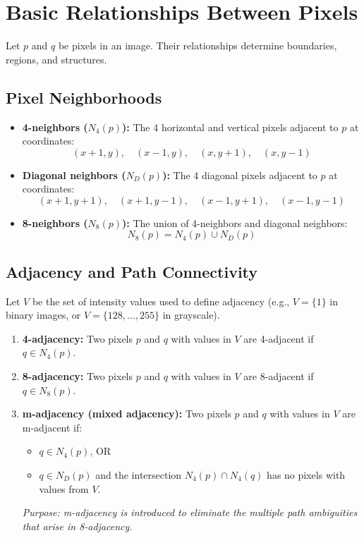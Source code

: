 \documentclass[12pt,a4paper]{article}
\begin{document}
\section{Basic Relationships Between Pixels}

Let $p$ and $q$ be pixels in an image. Their relationships determine boundaries, regions, and structures.

\subsection{Pixel Neighborhoods}
\begin{itemize}[leftmargin=*, itemsep=3.5pt]
  \item \textbf{4-neighbors ($N_4(p)$):} The 4 horizontal and vertical pixels adjacent to $p$ at coordinates:
    \begin{equation}
      (x+1, y), \quad (x-1, y), \quad (x, y+1), \quad (x, y-1)
    \end{equation}
  \item \textbf{Diagonal neighbors ($N_D(p)$):} The 4 diagonal pixels adjacent to $p$ at coordinates:
    \begin{equation}
      (x+1, y+1), \quad (x+1, y-1), \quad (x-1, y+1), \quad (x-1, y-1)
    \end{equation}
  \item \textbf{8-neighbors ($N_8(p)$):} The union of 4-neighbors and diagonal neighbors:
    \begin{equation}
      N_8(p) = N_4(p) \cup N_D(p)
    \end{equation}
\end{itemize}

\subsection{Adjacency and Path Connectivity}
Let $V$ be the set of intensity values used to define adjacency (e.g., $V = \{1\}$ in binary images, or $V = \{128, \dots, 255\}$ in grayscale).
\begin{enumerate}[leftmargin=*, itemsep=3.5pt]
  \item \textbf{4-adjacency:} Two pixels $p$ and $q$ with values in $V$ are 4-adjacent if $q \in N_4(p)$.
  \item \textbf{8-adjacency:} Two pixels $p$ and $q$ with values in $V$ are 8-adjacent if $q \in N_8(p)$.
  \item \textbf{m-adjacency (mixed adjacency):} Two pixels $p$ and $q$ with values in $V$ are m-adjacent if:
    \begin{itemize}[leftmargin=1.5em, itemsep=1pt]
      \item $q \in N_4(p)$, OR
      \item $q \in N_D(p)$ and the intersection $N_4(p) \cap N_4(q)$ has no pixels with values from $V$.
    \end{itemize}
    \textit{Purpose: m-adjacency is introduced to eliminate the multiple path ambiguities that arise in 8-adjacency.}
\end{enumerate}
\end{document}
